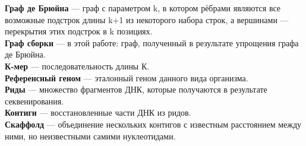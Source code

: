 \documentclass[14pt]{matmex-diploma-custom}
\begin{document}
\textbf{Граф де Брюйна} --- граф с параметром k, в котором рёбрами являются все возможные подстрок длины k+1 из некоторого набора строк, а вершинами --- перекрытия этих подстрок в k позициях.\\

\textbf{Граф сборки} --- в этой работе: граф, полученный в результате упрощения графа де Брюйна.\\

\textbf{К-мер} --- последовательность длины К.\\



\textbf{Референсный геном} --- эталонный геном данного вида организма.\\

\textbf{Риды} --- множество фрагментов ДНК, которые получаются в результате секвенирования.\\

\textbf{Контиги} --- восстановленные части ДНК из ридов.\\

\textbf{Скаффолд} --- объединение нескольких контигов с известным расстоянием между ними, но неизвестными самими нуклеотидами.\\


\setmonofont[Mapping=tex-text]{CMU Typewriter Text}


\end{document}
